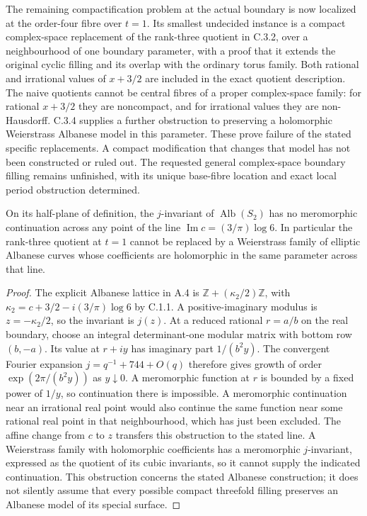 \begin{remark}\label{fam:src:C.3.3}\label{fam:st:C.3.3}
The remaining compactification problem at the actual boundary is now
localized at the order-four fibre over $t=1$. Its smallest undecided
instance is a compact complex-space replacement of the rank-three
quotient in C.3.2, over a neighbourhood of one boundary parameter,
with a proof that it extends the original cyclic filling and its overlap
with the ordinary torus family. Both rational and irrational values of
$x+3/2$ are included in the exact quotient description. The naive
quotients cannot be central fibres of a proper complex-space family:
for rational $x+3/2$ they are noncompact, and for irrational values
they are non-Hausdorff. C.3.4 supplies a further obstruction to preserving
a holomorphic Weierstrass Albanese model in this parameter.
These prove failure of the stated specific replacements. A compact
modification that changes that model has not been constructed or ruled
out. The requested general complex-space boundary filling remains
unfinished, with its unique base-fibre location and exact local period
obstruction determined.
\end{remark}

\begin{proposition}\label{fam:src:C.3.4}\label{fam:st:C.3.4}
On its half-plane of definition, the $j$-invariant of
$\operatorname{Alb}(S_2)$ has no meromorphic continuation across any
point of the line
$\operatorname{Im}c=(3/\pi)\log6$. In particular the rank-three quotient
at $t=1$ cannot be replaced by a Weierstrass family of elliptic Albanese
curves whose coefficients are holomorphic in the same parameter across
that line.
\end{proposition}
\begin{proof}
The explicit Albanese lattice in A.4 is
$\mathbb Z+(\kappa_2/2)\mathbb Z$, with
$\kappa_2=c+3/2-i(3/\pi)\log6$ by C.1.1. A positive-imaginary modulus is
$z=-\kappa_2/2$, so the invariant is $j(z)$. At a reduced rational
$r=a/b$ on the real boundary, choose an integral determinant-one modular
matrix with bottom row $(b,-a)$. Its value at $r+iy$ has imaginary part
$1/(b^2y)$. The convergent Fourier expansion $j=q^{-1}+744+O(q)$ therefore
gives growth of order $\exp(2\pi/(b^2y))$ as $y\downarrow0$.
A meromorphic function at $r$ is bounded by a fixed power of $1/y$,
so continuation there is impossible. A meromorphic continuation near an
irrational real point would also continue the same function near some
rational real point in that neighbourhood, which has just been excluded.
The affine change from $c$ to $z$ transfers this obstruction to the
stated line. A Weierstrass family with holomorphic coefficients has a
meromorphic $j$-invariant, expressed as the quotient of its cubic
invariants, so it cannot supply the indicated continuation. This
obstruction concerns the stated Albanese construction; it does not
silently assume that every possible compact threefold filling preserves
an Albanese model of its special surface.
\end{proof}

